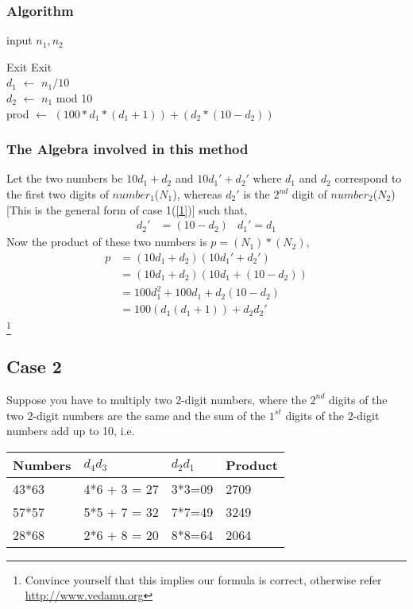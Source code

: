 \documentclass[12pt, a4paper]{article}
\begin{document}
	\subsubsection{Algorithm}
	\begin{algorithm}[H]
		input $n_1, n_2$ 
		\begin{algorithmic}[1]
			\State Exit
			\EndIf
			\State Exit
			\EndIf
			\\
			$d_1$ $\gets$ $n_1/10$ \\ 
			$d_2$ $\gets$ $n_1$ mod 10 \\
			prod $\gets$ $(100*d_1*(d_1+1)) + (d_2 * (10 - d_2))$ 
		\end{algorithmic}
	\end{algorithm}
	\subsubsection{The Algebra involved in this method}
	Let the two numbers be $10d_1+d_2$ and $10d_1'+d_2'$ where $d_1$ and $d_2$ correspond to the first two digits of $number_1$($N_1$), whereas $d_2'$ is the $2^{nd}$ digit of $number_2$($N_2$)[This is the general form of case 1(\ref{1})] such that,
	\begin{align*}
	d_2'&=(10-d_2) & d_1'=d_1
	\end{align*}
	Now the product of these two numbers is $p=(N_1)*(N_2)$,
	\begin{align*}
	p&=(10d_1+d_2)(10d_1'+d_2')\\
	&=(10d_1+d_2)(10d_1+(10-d_2))\\
	&=100d_1^2+100d_1+d_2(10-d_2)\\
	&=100(d_1(d_1+1))+d_2d_2'
	\end{align*}\footnote{Convince yourself that this implies our formula is correct, otherwise refer \url{http://www.vedamu.org}}\\
	\newpage
	\subsection{Case 2}
	\label{2}
	Suppose you have to multiply two 2-digit numbers, where the $2^{nd}$ digits of the two 2-digit numbers are the same and the sum of the $1^{st}$ digits of the 2-digit numbers add up to 10, i.e. %
	\begin{flushleft}
		\begin{tabular}{ |m{2.5cm}|m{2.5cm}|m{2.5cm}|m{2.5cm}| }
			\hline
			Numbers & $d_4d_3$ & $d_2d_1$ & Product\\ \hline
			43*63 & 4*6 + 3 = 27 & 3*3=09 & 2709\\ \hline
			57*57 & 5*5 + 7 = 32 & 7*7=49 & 3249\\ \hline
			28*68 & 2*6 + 8 = 20 & 8*8=64 & 2064\\
			\hline  	
		\end{tabular}
	\end{flushleft}
\end{document}
